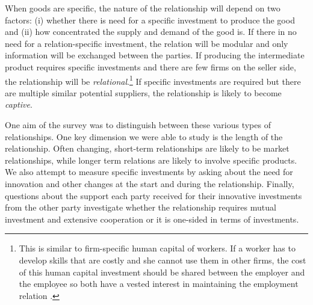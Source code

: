 \documentclass[final, dvipsnames, authoryear,12pt]{elsarticle}
\begin{document}
When goods are specific, the nature of the relationship will depend on two factors: (i) whether there is need for a specific investment to produce the good and (ii) how concentrated the supply and demand of the good is. If there in no need for a relation-specific investment, the relation will be modular and only information will be exchanged between the parties. If producing the intermediate product requires specific investments and there are few firms on the seller side, the relationship will be \textit{relational}.\footnote{This is similar to firm-specific human capital of workers. If a worker has to develop skills that are costly and she cannot use them in other firms, the cost of this human capital investment should be shared between the employer and the employee so both have a vested interest in maintaining the employment relation \citep{becker1962investment}.} If specific investments are required but there are multiple similar potential suppliers, the relationship is likely to become \textit{captive}.

One aim of the survey was to distinguish between these various  types of relationships. One key dimension we were able to study is the length of the relationship. Often changing, short-term relationships are likely to be market relationships, while longer term relations are likely to involve specific products. We also attempt to measure specific investments by asking about the need for innovation and other changes at the start and during the relationship. Finally, questions about the support each party received for their innovative investments from the other party investigate whether the relationship requires mutual investment and extensive cooperation or it is one-sided in terms of investments. 

    


\end{document}
